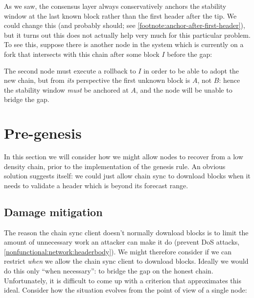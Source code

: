As we saw, the consensus layer always conservatively anchors the stability
window at the last known block rather than the first header after the tip. We
could change this (and probably should; see
\cref{footnote:anchor-after-first-header}), but it turns out this does not
actually help very much for this particular problem. To see this, suppose there
is another node in the system which is currently on a fork that intersects with
this chain after some block $I$ before the gap:
%
\begin{center}
\end{center}
%
The second node must execute a rollback to $I$ in order to be able to adopt
the new chain, but from \emph{its} perspective the first unknown block is $A$,
not $B$: hence the stability window \emph{must} be anchored at $A$, and the
node will be unable to bridge the gap.

\section{Pre-genesis}
\label{low-density:pre-genesis}

In this section we will consider how we might allow nodes to recover from a low
density chain, prior to the implementation of the genesis rule. An obvious
solution suggests itself: we could just allow chain sync to download blocks
when it needs to validate a header which is beyond its forecast range.

\subsection{Damage mitigation}

The reason the chain sync client doesn't normally download blocks is to limit
the amount of unnecessary work an attacker can make it do (prevent DoS attacks,
\cref{nonfunctional:network:headerbody}). We might therefore consider if we can
restrict \emph{when} we allow the chain sync client to download blocks. Ideally
we would do this only ``when necessary'': to bridge the gap on the honest chain.
Unfortunately, it is difficult to come up with a criterion that
approximates this ideal. Consider how the situation evolves from the point of
view of a single node:

